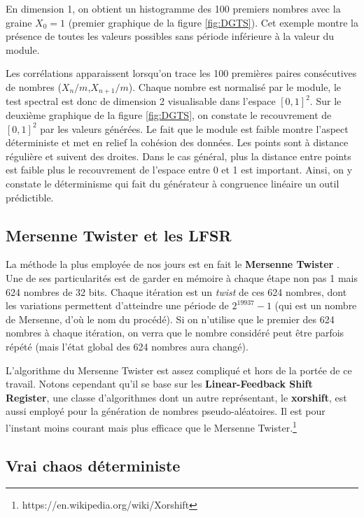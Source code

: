 \documentclass{scrartcl}
\begin{document}
En dimension 1, on obtient un histogramme des 100 premiers nombres avec la
graine $X_0 = 1$ (premier graphique de la figure \ref{fig:DGTS}).  Cet exemple
montre la présence de toutes les valeurs possibles sans période inférieure à la
valeur du module.\par
Les corrélations apparaissent lorsqu'on trace les 100 premières paires
consécutives de nombres ($X_n/m$,$X_{n+1}/m$).  Chaque nombre est normalisé par
le module, le test spectral est donc de dimension 2 visualisable dans l'espace
$[0,1]^2$.  Sur le deuxième graphique de la figure \ref{fig:DGTS}, on constate
le recouvrement de $[0,1]^2$ par les valeurs générées.  Le fait que le module
est faible montre l'aspect déterministe et met en relief la cohésion des
données. Les points sont à distance régulière et suivent des droites.  Dans le
cas général, plus la distance entre points est faible plus le recouvrement de
l'espace entre 0 et 1 est important.  Ainsi, on y constate le déterminisme qui
fait du générateur à congruence linéaire un outil prédictible.

\subsection{Mersenne Twister et les LFSR}\label{s:MT}
La méthode la plus employée de nos jours est en fait le \textbf{Mersenne
  Twister} \cite{MT}. Une de ses particularités est de garder en mémoire à
chaque étape non pas 1 mais 624 nombres de 32 bits. Chaque itération est un
\textit{twist} de ces 624 nombres, dont les variations permettent d'atteindre
une période de $2^{19937}-1$ (qui est un nombre de Mersenne, d'où le nom du
procédé). Si on n'utilise que le premier des 624 nombres à chaque itération, on
verra que le nombre considéré peut être parfois répété (mais l'état global des
624 nombres aura changé).

L'algorithme du Mersenne Twister est assez compliqué et hors de la portée de ce
travail. Notons cependant qu'il se base sur les  \textbf{Linear-Feedback Shift
  Register}, une classe d'algorithmes dont un autre représentant, le
\textbf{xorshift}, est aussi employé pour la génération de nombres
pseudo-aléatoires. Il est pour l'instant moins courant mais plus efficace que
le Mersenne Twister.\footnote{https://en.wikipedia.org/wiki/Xorshift}

\subsection{Vrai chaos déterministe}
\end{document}

